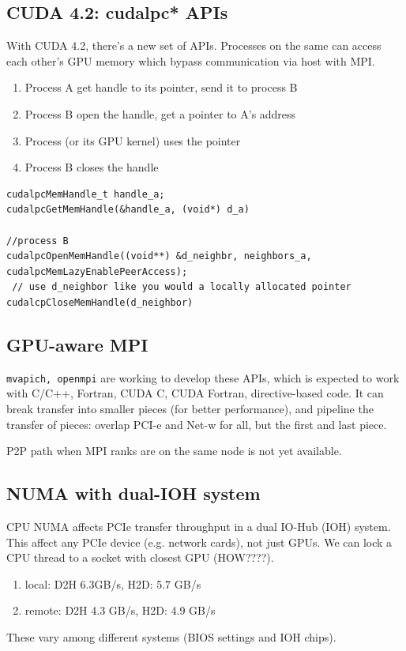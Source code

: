\subsection{CUDA 4.2: cudalpc* APIs}

With CUDA 4.2, there's a new set of APIs. Processes on the same can access each
other's GPU memory which  bypass communication via host with MPI.

\begin{enumerate}
  \item Process A get handle to its pointer, send it to process B
  \item Process B open the handle, get a pointer to A's address
  \item Process (or its GPU kernel) uses the pointer
  \item Process B closes the handle
\end{enumerate}

\begin{verbatim}
cudalpcMemHandle_t handle_a;
cudalpcGetMemHandle(&handle_a, (void*) d_a)

//process B
cudalpcOpenMemHandle((void**) &d_neighbr, neighbors_a,
cudalpcMemLazyEnablePeerAccess);
 // use d_neighbor like you would a locally allocated pointer
cudalcpCloseMemHandle(d_neighbor)
\end{verbatim}


\subsection{GPU-aware MPI}

\verb!mvapich, openmpi! are working to develop these APIs, which is expected to
work with C/C++, Fortran, CUDA C, CUDA Fortran, directive-based code. It can
break transfer into smaller pieces (for better performance), and pipeline the
transfer of pieces: overlap PCI-e and Net-w for all, but the first and last
piece. 

P2P path when MPI ranks are on the same node is not yet available. 


\subsection{NUMA with dual-IOH system}

CPU NUMA affects PCIe transfer throughput in a dual IO-Hub (IOH) system. This
affect any PCIe device (e.g. network cards), not just GPUs. We can lock a CPU
thread to a socket with closest GPU (HOW????). 
\begin{enumerate}
  \item local: D2H 6.3GB/s, H2D: 5.7 GB/s
  \item remote: D2H 4.3 GB/s, H2D: 4.9 GB/s
\end{enumerate}
These vary among different systems (BIOS settings and IOH chips). 

